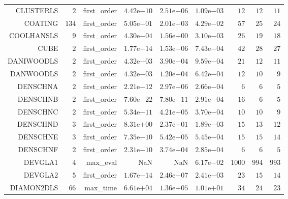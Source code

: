 \begin{longtable}{rrrrrrrrr}
CLUSTERLS & \(     2\) & first\_order & \( 4.42\)e\(-10\) & \( 2.51\)e\(-06\) & \( 1.09\)e\(-03\) & \(    12\) & \(    12\) & \(    11\) \\
COATING & \(   134\) & first\_order & \( 5.05\)e\(-01\) & \( 2.01\)e\(-03\) & \( 4.29\)e\(-02\) & \(    57\) & \(    25\) & \(    24\) \\
COOLHANSLS & \(     9\) & first\_order & \( 4.30\)e\(-04\) & \( 1.56\)e\(+00\) & \( 3.10\)e\(-03\) & \(    26\) & \(    19\) & \(    18\) \\
CUBE & \(     2\) & first\_order & \( 1.77\)e\(-14\) & \( 1.53\)e\(-06\) & \( 7.43\)e\(-04\) & \(    42\) & \(    28\) & \(    27\) \\
DANIWOODLS & \(     2\) & first\_order & \( 4.32\)e\(-03\) & \( 3.90\)e\(-04\) & \( 9.59\)e\(-04\) & \(    21\) & \(    12\) & \(    11\) \\
DANWOODLS & \(     2\) & first\_order & \( 4.32\)e\(-03\) & \( 1.20\)e\(-04\) & \( 6.42\)e\(-04\) & \(    12\) & \(    10\) & \(     9\) \\
DENSCHNA & \(     2\) & first\_order & \( 2.21\)e\(-12\) & \( 2.97\)e\(-06\) & \( 2.66\)e\(-04\) & \(     6\) & \(     6\) & \(     5\) \\
DENSCHNB & \(     2\) & first\_order & \( 7.60\)e\(-22\) & \( 7.80\)e\(-11\) & \( 2.91\)e\(-04\) & \(    16\) & \(     6\) & \(     5\) \\
DENSCHNC & \(     2\) & first\_order & \( 5.34\)e\(-11\) & \( 4.21\)e\(-05\) & \( 3.70\)e\(-04\) & \(    10\) & \(    10\) & \(     9\) \\
DENSCHND & \(     3\) & first\_order & \( 8.31\)e\(+00\) & \( 2.37\)e\(+01\) & \( 1.89\)e\(-03\) & \(    15\) & \(    13\) & \(    12\) \\
DENSCHNE & \(     3\) & first\_order & \( 7.35\)e\(-10\) & \( 5.42\)e\(-05\) & \( 5.45\)e\(-04\) & \(    15\) & \(    15\) & \(    14\) \\
DENSCHNF & \(     2\) & first\_order & \( 2.31\)e\(-10\) & \( 3.74\)e\(-04\) & \( 2.85\)e\(-04\) & \(     6\) & \(     6\) & \(     5\) \\
DEVGLA1 & \(     4\) & max\_eval &       NaN &       NaN & \( 6.17\)e\(-02\) & \(  1000\) & \(   994\) & \(   993\) \\
DEVGLA2 & \(     5\) & first\_order & \( 1.67\)e\(-14\) & \( 2.46\)e\(-07\) & \( 2.41\)e\(-03\) & \(    23\) & \(    15\) & \(    14\) \\
DIAMON2DLS & \(    66\) & max\_time & \( 6.61\)e\(+04\) & \( 1.36\)e\(+05\) & \( 1.01\)e\(+01\) & \(    34\) & \(    24\) & \(    23\) \\

\end{longtable}
